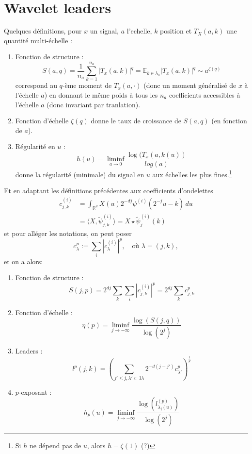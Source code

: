 \documentclass[11pt]{article} %
\begin{document}
\section{Wavelet leaders}
	Quelques définitions, pour $x$ un signal, $a$ l'echelle, $k$ position et $T_X(a,k)$ une quantité multi-échelle :
	\begin{enumerate}
		\item Fonction de structure :
			\begin{equation}
				S(a,q) = \frac{1}{n_a}\sum_{k=1}^{n_a} |T_x(a,k)|^q = \mathbb{E}_{k\in\lambda_a} |T_x(a,k)|^q \sim a^{\zeta(q)}
			\end{equation}
			correspond au $q$-ème moment de $T_x(a,\cdot)$ (donc un moment généralisé de $x$ à l'échelle $a$) en donnant le même poids à tous les $n_a$ coefficients accessibles à l'échelle $a$ (donc invariant par tranlation). 
		\item Fonction d'échelle $\zeta(q)$ donne le taux de croissance de $S(a,q)$ (en fonction de $a$).
		\item Régularité en $u$ :
			\begin{equation}
				h(u) = \liminf_{a\to 0} \frac{\log(T_x(a, k(u))}{log(a)}
			\end{equation}
			donne la régularité (minimale) du signal en $u$ aux échelles les plus fines.\footnote{Si $h$ ne dépend pas de $u$, alors $h = \zeta(1)$ (?)} 
	\end{enumerate}
	Et en adaptant les définitions précédentes aux coefficients d'ondelettes
	\begin{align}
		c_{j,k}^{(i)} 	&= \int_{\mathbb{R}^d} X(u)2^{-dj}\psi^{(i)}(2^{-j}u -k) \,du\\
					&= \langle X, \tilde\psi_{j,k}^{(i)} \rangle = X\star \tilde\psi_{j}^{(i)}(k)
	\end{align}
	et pour alléger les notations, on peut poser
	\begin{equation}
		c_{\lambda}^p := \sum_i |c_{\lambda}^{(i)}|^p,\quad\text{où $\lambda=(j,k) $},
	\end{equation}
	 et on a alors:
	\begin{enumerate}
		\item Fonction de structure :
			\begin{equation}
				S(j,p) = 2^{dj}\sum_k\sum_i |c_{j,k}^{(i)}|^p = 2^{dj}\sum_k c_{j,k}^p
			\end{equation}
		\item Fonction d'échelle :
			\begin{equation}
				\eta(p) = \liminf_{j\to-\infty} \frac{\log(S(j,q))}{\log(2^j)}
			\end{equation}
		\item Leaders :
			\begin{equation}
				l^p(j,k) = \left( \sum_{j'\leq j, \lambda'\subset 3\lambda} 2^{-d(j-j')} c_{\lambda'}^p \right)^{\frac{1}{p}}
			\end{equation}
		\item $p$-exposant :
			\begin{equation}
				h_p(u) = \liminf_{j\to -\infty} \frac{\log(l_{\lambda_j(u)}^{(p)})}{\log(2^j)}
			\end{equation}
	\end{enumerate}
\end{document}

